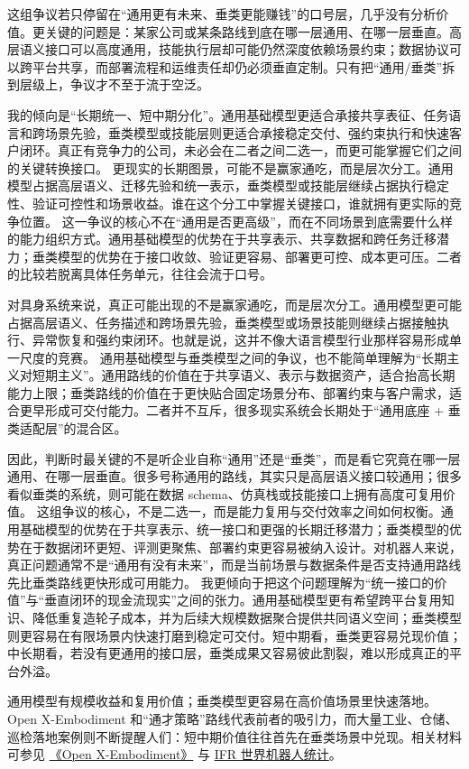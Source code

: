 这组争议若只停留在“通用更有未来、垂类更能赚钱”的口号层，几乎没有分析价值。更关键的问题是：某家公司或某条路线到底在哪一层通用、在哪一层垂直。高层语义接口可以高度通用，技能执行层却可能仍然深度依赖场景约束；数据协议可以跨平台共享，而部署流程和运维责任却仍必须垂直定制。只有把“通用/垂类”拆到层级上，争议才不至于流于空泛。

我的倾向是“长期统一、短中期分化”。通用基础模型更适合承接共享表征、任务语言和跨场景先验，垂类模型或技能层则更适合承接稳定交付、强约束执行和快速客户闭环。真正有竞争力的公司，未必会在二者之间二选一，而更可能掌握它们之间的关键转换接口。 更现实的长期图景，可能不是赢家通吃，而是层次分工。通用模型占据高层语义、迁移先验和统一表示，垂类模型或技能层继续占据执行稳定性、验证可控性和场景收益。谁在这个分工中掌握关键接口，谁就拥有更实际的竞争位置。 这一争议的核心不在“通用是否更高级”，而在不同场景到底需要什么样的能力组织方式。通用基础模型的优势在于共享表示、共享数据和跨任务迁移潜力；垂类模型的优势在于接口收敛、验证更容易、部署更可控、成本更可压。二者的比较若脱离具体任务单元，往往会流于口号。

对具身系统来说，真正可能出现的不是赢家通吃，而是层次分工。通用模型更可能占据高层语义、任务描述和跨场景先验，垂类模型或场景技能则继续占据接触执行、异常恢复和强约束闭环。也就是说，这并不像大语言模型行业那样容易形成单一尺度的竞赛。 通用基础模型与垂类模型之间的争议，也不能简单理解为“长期主义对短期主义”。通用路线的价值在于共享语义、表示与数据资产，适合抬高长期能力上限；垂类路线的价值在于更快贴合固定场景分布、部署约束与客户需求，适合更早形成可交付能力。二者并不互斥，很多现实系统会长期处于“通用底座 + 垂类适配层”的混合区。

因此，判断时最关键的不是听企业自称“通用”还是“垂类”，而是看它究竟在哪一层通用、在哪一层垂直。很多号称通用的路线，其实只是高层语义接口较通用；很多看似垂类的系统，则可能在数据 schema、仿真栈或技能接口上拥有高度可复用价值。 这组争议的核心，不是二选一，而是能力复用与交付效率之间如何权衡。通用基础模型的优势在于共享表示、统一接口和更强的长期迁移潜力；垂类模型的优势在于数据闭环更短、评测更聚焦、部署约束更容易被纳入设计。对机器人来说，真正问题通常不是“通用有没有未来”，而是当前场景与数据条件是否支持通用路线先比垂类路线更快形成可用能力。 我更倾向于把这个问题理解为“统一接口的价值”与“垂直闭环的现金流现实”之间的张力。通用基础模型更有希望跨平台复用知识、降低重复造轮子成本，并为后续大规模数据聚合提供共同语义空间；垂类模型则更容易在有限场景内快速打磨到稳定可交付。短中期看，垂类更容易兑现价值；中长期看，若没有更通用的接口层，垂类成果又容易彼此割裂，难以形成真正的平台外溢。

通用模型有规模收益和复用价值；垂类模型更容易在高价值场景里快速落地。Open X-Embodiment 和“通才策略”路线代表前者的吸引力，而大量工业、仓储、巡检落地案例则不断提醒人们：短中期价值往往首先在垂类场景中兑现。相关材料可参见 \href{https://arxiv.org/abs/2310.08864}{《Open X-Embodiment》} 与 \href{https://ifr.org/worldrobotics/}{IFR 世界机器人统计}。

